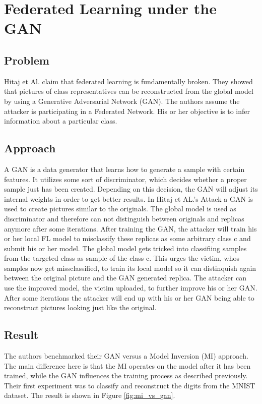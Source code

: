 \documentclass[
	ngerman,
	ruledheaders=section,%
	class=report,%
	thesis={type=bachelor},%
	accentcolor=1b,%
	custommargins=true,%
	marginpar=false,%
	parskip=half-,%
	fontsize=11pt,%
]{tudapub}
\begin{document}
\section{Federated Learning under the GAN}
\subsection{Problem}
Hitaj et Al. \cite{hitaj2017deep} claim that federated learning is fundamentally broken. They showed that pictures of class representatives can be reconstructed from the global model by using a Generative Adversarial Network (GAN). The authors assume the attacker is participating in a Federated Network. His or her objective is to infer information about a particular class.

\subsection{Approach}
A GAN is a data generator that learns how to generate a sample with certain features. It utilizes some sort of discriminator, which decides whether a proper sample just has been created. Depending on this decision, the GAN will adjust its internal weights in order to get better results. In Hitaj et AL.'s Attack a GAN is used to create pictures similar to the originals. The global model is used as discriminator and therefore can not distinguish between originals and replicas anymore after some iterations. After training the GAN, the attacker will train his or her local FL model to misclassify these replicas as some arbitrary class c and submit his or her model. The global model gets tricked into classifiing samples from the targeted class as sample of the class c. This urges the victim, whos samples now get missclassified, to train its local model so it can distinquish again between the original picture and the GAN generated replica. The attacker can use the improved model, the victim uploaded, to further improve his or her GAN. After some iterations the attacker will end up with his or her GAN being able to reconstruct pictures looking just like the original.

\subsection{Result}
The authors benchmarked their GAN versus a Model Inversion (MI) approach. The main difference here is that the MI operates on the model after it has been trained, while the GAN influences the training process as described previously. Their first experiment was to classify and reconstruct the digits from the MNIST dataset. The  result is shown in Figure \ref{fig:mi_vs_gan}.
\end{document}
